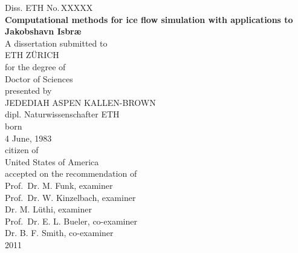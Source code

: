 \begin{titlepage}
  \begin{center}
    \large
    Diss. ETH No.\,XXXXX\\ 
    \vspace{2.0cm} 
    \LARGE
    \textbf{
      Computational methods for ice flow simulation with applications to Jakobshavn Isbr{\ae}
    }
    \large
    \\    
    \vspace{1.5cm}
    A dissertation submitted to\\[0.5em]

    ETH Z\"URICH \\[2.0em]


    for the degree of \\[0.5em]

    Doctor of Sciences\\[3.0em]


    presented by \\[0.5em]

    JEDEDIAH ASPEN KALLEN-BROWN \\[0.5em]

    dipl. Naturwissenschafter ETH \\[2.0em]

    born\\[0.5em]
    4 June, 1983\\[2.0em]

    citizen of\\[0.5em]

    United States of America\\[3.0em]



    accepted on the recommendation of\\[1.0em]

    Prof.~Dr. M. Funk, examiner\\[0.5em]

    Prof.~Dr. W. Kinzelbach, examiner\\[0.5em]

    Dr. M. L\"uthi, examiner\\[0.5em]

    Prof.~Dr. E. L. Bueler, co-examiner\\[0.5em]

    Dr. B. F. Smith, co-examiner\\[5.0em]

    2011\\
  \end{center}
\end{titlepage}


